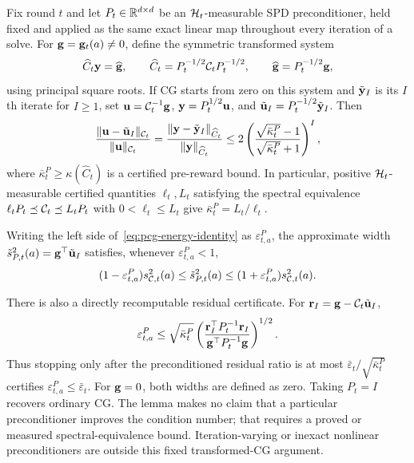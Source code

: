 \iflegacyextras
\begin{lemma}\label{lem:pcg}
Fix round $t$ and let $P_t\in\mathbb{R}^{d\times d}$ be an
$\mathcal{H}_t$-measurable SPD preconditioner, held fixed and applied as the same
exact linear map throughout every iteration of a solve.  For
$\mathbf{g}=\mathbf{g}_t(a)\ne0$, define the symmetric transformed system
\begin{equation}\label{eq:pcg-transformed-system}
 \widehat C_t\mathbf{y}=\widehat{\mathbf{g}},\qquad
 \widehat C_t=P_t^{-1/2}\mathcal{C}_tP_t^{-1/2},\qquad
 \widehat{\mathbf{g}}=P_t^{-1/2}\mathbf{g},
\end{equation}
using principal square roots.  If CG starts from zero on this system and
$\tilde{\mathbf{y}}_I$ is its $I$th iterate for $I\ge1$, set
$\mathbf{u}=\mathcal{C}_t^{-1}\mathbf{g}$, $\mathbf{y}=P_t^{1/2}\mathbf{u}$, and
$\tilde{\mathbf{u}}_I=P_t^{-1/2}\tilde{\mathbf{y}}_I$.  Then
\begin{equation}\label{eq:pcg-energy-identity}
 \frac{\|\mathbf{u}-\tilde{\mathbf{u}}_I\|_{\mathcal{C}_t}}{\|\mathbf{u}\|_{\mathcal{C}_t}}
 =\frac{\|\mathbf{y}-\tilde{\mathbf{y}}_I\|_{\widehat C_t}}
 {\|\mathbf{y}\|_{\widehat C_t}}
 \le2\left(\frac{\sqrt{\bar\kappa_t^P}-1}
 {\sqrt{\bar\kappa_t^P}+1}\right)^I,
\end{equation}
where
$\bar\kappa_t^P\ge\kappa(\widehat C_t)$ is a certified pre-reward bound.
In particular, positive $\mathcal{H}_t$-measurable certified quantities
$\ell_t,L_t$ satisfying the spectral equivalence
$\ell_tP_t\preceq\mathcal{C}_t\preceq L_tP_t$ with
$0<\ell_t\le L_t$ give
$\bar\kappa_t^P=L_t/\ell_t$.

Writing the left side of~\eqref{eq:pcg-energy-identity} as
$\varepsilon_{t,a}^P$, the approximate width
$\tilde s_{P,t}^2(a)=\mathbf{g}^\top\tilde{\mathbf{u}}_I$ satisfies, whenever
$\varepsilon_{t,a}^P<1$,
\begin{equation}\label{eq:pcg-width-sandwich}
 (1-\varepsilon_{t,a}^P)s_{\mathcal{C},t}^2(a)
 \le\tilde s_{P,t}^2(a)
 \le(1+\varepsilon_{t,a}^P)s_{\mathcal{C},t}^2(a).
\end{equation}

There is also a directly recomputable residual certificate.  For
$\mathbf{r}_I=\mathbf{g}-\mathcal{C}_t\tilde{\mathbf{u}}_I$,
\begin{equation}\label{eq:pcg-residual-certificate}
 \varepsilon_{t,a}^P
 \le\sqrt{\bar\kappa_t^P}
 \left(\frac{\mathbf{r}_I^\top P_t^{-1}\mathbf{r}_I}
 {\mathbf{g}^\top P_t^{-1}\mathbf{g}}\right)^{1/2}.
\end{equation}
Thus stopping only after the preconditioned residual ratio is at most
$\bar\varepsilon_t/\sqrt{\bar\kappa_t^P}$ certifies
$\varepsilon_{t,a}^P\le\bar\varepsilon_t$.  For $\mathbf{g}=0$, both widths are
defined as zero.  Taking $P_t=I$ recovers ordinary CG.  The lemma makes no
claim that a particular preconditioner improves the condition number; that
requires a proved or measured spectral-equivalence bound.  Iteration-varying
or inexact nonlinear preconditioners are outside this fixed transformed-CG
argument.
\end{lemma}
